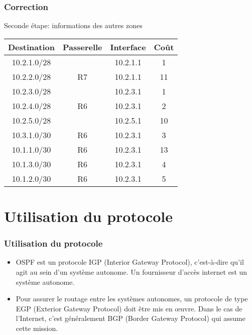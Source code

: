\documentclass[svgnames,11pt]{beamer}
\begin{document}
\begin{frame}
    \frametitle{Correction}
    Seconde étape: informations des autres zones
    \begin{center}
        \begin{tabular}{|*{4}{c|}}
            \hline
            Destination & Passerelle    & Interface & Coût \\
            \hline
            10.2.1.0/28 &               & 10.2.1.1  & 1    \\
            \hline
            10.2.2.0/28 & R7 & 10.2.1.1  & 11    \\
            \hline
            10.2.3.0/28 &               & 10.2.3.1  & 1   \\
            \hline
            10.2.4.0/28 & R6 & 10.2.3.1  & 2    \\
            \hline
            10.2.5.0/28 &  & 10.2.5.1  & 10    \\
            \hline
            10.3.1.0/30 & R6 & 10.2.3.1  & 3    \\
            \hline
            10.1.1.0/30 & R6 & 10.2.3.1  & 13    \\
            \hline
            10.1.3.0/30 & R6 & 10.2.3.1  & 4    \\
            \hline
            10.1.2.0/30 & R6 & 10.2.3.1  & 5    \\
            \hline
        \end{tabular}
    \end{center}

\end{frame}
\section{Utilisation du protocole}
\begin{frame}
    \frametitle{Utilisation du protocole}

    \begin{itemize}
        \item<1-> OSPF est un protocole IGP (Interior Gateway Protocol), c'est-à-dire qu'il agit au sein d'un système autonome. Un fournisseur d'accès internet est un système autonome.
        \item<2-> Pour assurer le routage entre les systèmes autonomes, un protocole de type EGP (Exterior Gateway Protocol) doit être mis en œuvre. Dans le cas de l'Internet, c'est généralement BGP (Border Gateway Protocol) qui assume cette mission.
    \end{itemize}

\end{frame}
\end{document}
